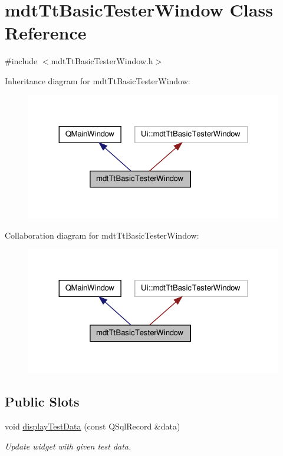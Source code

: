 \hypertarget{classmdt_tt_basic_tester_window}{\section{mdt\-Tt\-Basic\-Tester\-Window Class Reference}
\label{classmdt_tt_basic_tester_window}
}


{\ttfamily \#include $<$mdt\-Tt\-Basic\-Tester\-Window.\-h$>$}



Inheritance diagram for mdt\-Tt\-Basic\-Tester\-Window\-:
\nopagebreak
\begin{figure}[H]
\begin{center}
\leavevmode
\includegraphics[width=324pt]{classmdt_tt_basic_tester_window__inherit__graph}
\end{center}
\end{figure}


Collaboration diagram for mdt\-Tt\-Basic\-Tester\-Window\-:
\nopagebreak
\begin{figure}[H]
\begin{center}
\leavevmode
\includegraphics[width=324pt]{classmdt_tt_basic_tester_window__coll__graph}
\end{center}
\end{figure}
\subsection*{Public Slots}
\begin{DoxyCompactItemize}
\item 
void \hyperlink{classmdt_tt_basic_tester_window_afaf6162daad8565f2bbcb9adf71b80b1}{display\-Test\-Data} (const Q\-Sql\-Record \&data)
\begin{DoxyCompactList}\small\item\em Update widget with given test data. \end{DoxyCompactList}\end{DoxyCompactItemize}
